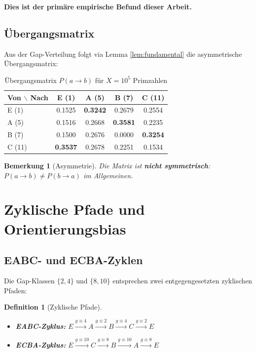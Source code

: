 \documentclass[11pt,a4paper]{article}
\newtheorem{definition}[theorem]{Definition}
\newtheorem{remark}[theorem]{Bemerkung}
\begin{document}
\textbf{Dies ist der primäre empirische Befund dieser Arbeit.}

\subsection{Übergangsmatrix}

Aus der Gap-Verteilung folgt via Lemma \ref{lem:fundamental} die asymmetrische Übergangsmatrix:

\begin{table}[h]
\centering
\caption{Übergangsmatrix $P(a \to b)$ für $X = 10^5$ Primzahlen}
\label{tab:transition}
\begin{tabular}{@{}lcccc@{}}
\toprule
Von $\backslash$ Nach & E (1) & A (5) & B (7) & C (11) \\ \midrule
E (1)  & 0.1525 & \textbf{0.3242} & 0.2679 & 0.2554 \\
A (5)  & 0.1516 & 0.2668 & \textbf{0.3581} & 0.2235 \\
B (7)  & 0.1500 & 0.2676 & 0.0000 & \textbf{0.3254} \\
C (11) & \textbf{0.3537} & 0.2678 & 0.2251 & 0.1534 \\ \bottomrule
\end{tabular}
\end{table}

\begin{remark}[Asymmetrie]
Die Matrix ist \textbf{nicht symmetrisch}: $P(a \to b) \neq P(b \to a)$ im Allgemeinen.
\end{remark}

\section{Zyklische Pfade und Orientierungsbias}

\subsection{EABC- und ECBA-Zyklen}

Die Gap-Klassen $\{2, 4\}$ und $\{8, 10\}$ entsprechen zwei entgegengesetzten zyklischen Pfaden:

\begin{definition}[Zyklische Pfade]
\begin{itemize}
\item \textbf{EABC-Zyklus:} $E \xrightarrow{g \equiv 4} A \xrightarrow{g \equiv 2} B \xrightarrow{g \equiv 4} C \xrightarrow{g \equiv 2} E$
\item \textbf{ECBA-Zyklus:} $E \xrightarrow{g \equiv 10} C \xrightarrow{g \equiv 8} B \xrightarrow{g \equiv 10} A \xrightarrow{g \equiv 8} E$
\end{itemize}
\end{definition}
\end{document}
